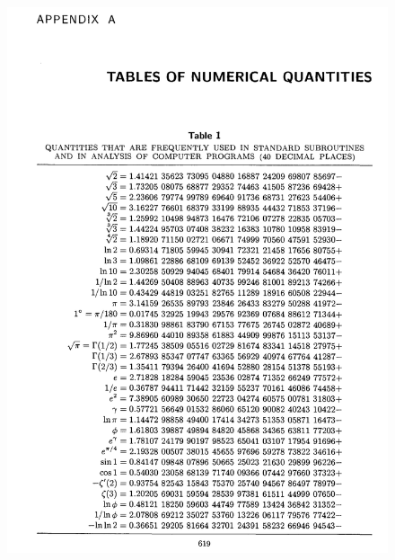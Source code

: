 \documentclass[dvipdfmx,a4paper,12pt]{jsarticle}
\begin{document}
   \begin{figure}[htbp]
  \centering
  \includegraphics[width=142mm,angle=0]{images/appen.png}
  \end{figure}

\newpage
\end{document}
